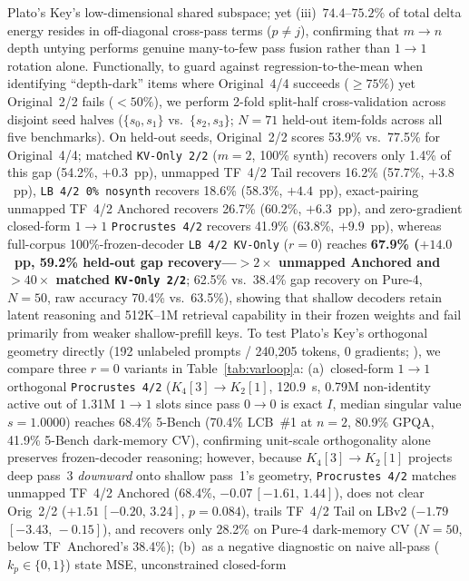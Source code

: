 \documentclass[11pt]{article}
\newcommand{\ci}[2]{\,{\scriptsize\ensuremath{[#1,\,#2]}}}
\begin{document}
\begin{enumerate}
Plato's Key's low-dimensional shared subspace; yet
(iii)~$74.4\text{--}75.2\%$ of total delta energy resides in off-diagonal cross-pass terms ($p{\neq}j$), confirming that
$m{\to}n$ depth untying performs genuine many-to-few pass fusion rather than $1{\to}1$ rotation alone.
Functionally, to guard against regression-to-the-mean when identifying ``depth-dark'' items where Original~4/4 succeeds
($\ge 75\%$) yet Original~2/2 fails ($<50\%$), we perform 2-fold split-half cross-validation across disjoint seed halves
($\{s_0,s_1\}$ vs.\ $\{s_2,s_3\}$; $N{=}71$ held-out item-folds across all five benchmarks). On held-out seeds, Original~2/2
scores 53.9\% vs.\ 77.5\% for Original~4/4; matched \texttt{KV-Only~2/2} ($m{=}2$, 100\% synth) recovers only 1.4\% of
this gap (54.2\%, $+0.3$~pp), unmapped TF~4/2 Tail recovers 16.2\% (57.7\%, $+3.8$~pp), \texttt{LB~4/2~0\% nosynth}
recovers 18.6\% (58.3\%, $+4.4$~pp), exact-pairing unmapped TF~4/2 Anchored recovers 26.7\% (60.2\%, $+6.3$~pp), and
zero-gradient closed-form $1{\to}1$ \texttt{Procrustes~4/2} recovers 41.9\% (63.8\%, $+9.9$~pp), whereas full-corpus
100\%-frozen-decoder \texttt{LB 4/2 KV-Only} ($r{=}0$) reaches \textbf{67.9\% ($+14.0$~pp, 59.2\% held-out gap
recovery---$>2\times$ unmapped Anchored and $>40\times$ matched \texttt{KV-Only~2/2}}; 62.5\% vs.\ 38.4\% gap recovery
on Pure-4, $N{=}50$, raw accuracy 70.4\% vs.\ 63.5\%), showing that shallow decoders retain latent reasoning and
512K--1M retrieval capability in their frozen weights and fail primarily from weaker shallow-prefill keys.
To test Plato's Key's orthogonal geometry directly (192 unlabeled prompts / 240,205 tokens, 0 gradients;
), we compare three $r{=}0$ variants in Table~\ref{tab:varloop}a:
(a)~closed-form $1{\to}1$ orthogonal \texttt{Procrustes~4/2} ($K_4[3]\to K_2[1]$, 120.9~s, 0.79M non-identity active
out of 1.31M $1{\to}1$ slots since pass $0{\to}0$ is exact $I$, median singular value $s{=}1.0000$) reaches 68.4\%
5-Bench (70.4\% LCB~\#1 at $n{=}2$, 80.9\% GPQA, 41.9\% 5-Bench dark-memory CV), confirming unit-scale orthogonality
alone preserves frozen-decoder reasoning; however, because $K_4[3]\to K_2[1]$ projects deep pass~3 \emph{downward} onto
shallow pass~1's geometry, \texttt{Procrustes~4/2} matches unmapped TF~4/2 Anchored (68.4\%, $-0.07$\ci{-1.61}{1.44}),
does not clear Orig~2/2 ($+1.51$\ci{-0.20}{3.24}, $p{=}0.084$), trails TF~4/2 Tail on LBv2 ($-1.79$\ci{-3.43}{-0.15}),
and recovers only 28.2\% on Pure-4 dark-memory CV ($N{=}50$, below TF~Anchored's 38.4\%);
(b)~as a negative diagnostic on naive all-pass ($k_p{\in}\{0,1\}$) state MSE, unconstrained closed-form

\end{enumerate}
\end{document}
